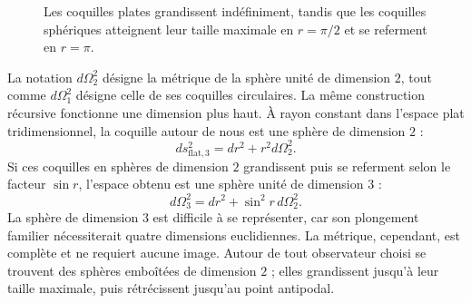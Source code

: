 \begin{figure}[htbp]
\centering
{}%
\caption{Les coquilles plates grandissent indéfiniment, tandis que les coquilles sphériques atteignent leur taille maximale en \(r=\pi/2\) et se referment en \(r=\pi\).}
\label{fig:c03-shells-flat-sphere}
\end{figure}

La notation \(d\Omega_2^2\) désigne la métrique de la sphère unité de dimension \(2\), tout comme \(d\Omega_1^2\) désigne celle de ses coquilles circulaires. La même construction récursive fonctionne une dimension plus haut. À rayon constant dans l’espace plat tridimensionnel, la coquille autour de nous est une sphère de dimension \(2\) :
\begin{equation}
ds_{\text{flat},3}^2 = dr^2 + r^2 d\Omega_2^2.
\label{eq:c03-flat-three-polar}
\end{equation}
Si ces coquilles en sphères de dimension \(2\) grandissent puis se referment selon le facteur \(\sin r\), l’espace obtenu est une sphère unité de dimension \(3\) :
\begin{equation}
d\Omega_3^2 = dr^2 + \sin^2 r\, d\Omega_2^2.
\label{eq:c03-three-sphere}
\end{equation}
La sphère de dimension \(3\) est difficile à se représenter, car son plongement familier nécessiterait quatre dimensions euclidiennes. La métrique, cependant, est complète et ne requiert aucune image. Autour de tout observateur choisi se trouvent des sphères emboîtées de dimension \(2\) ; elles grandissent jusqu’à leur taille maximale, puis rétrécissent jusqu’au point antipodal.

